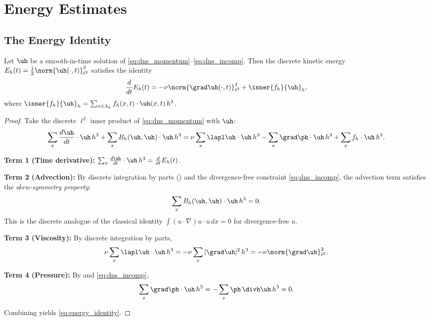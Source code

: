 \documentclass[12pt, a4paper]{article}
\theoremstyle{plain}
\theoremstyle{definition}
\begin{document}
\section{Energy Estimates}\label{sec:energy}

\subsection{The Energy Identity}

\begin{proposition}\label{prop:energy_id}
  Let $\uh$ be a smooth-in-time solution of \eqref{eq:dns_momentum}--\eqref{eq:dns_incomp}.
  Then the discrete kinetic energy $E_h(t) = \frac{1}{2}\norm{\uh(\cdot,t)}_{\ell^2}^2$
  satisfies the identity
  \begin{equation}\label{eq:energy_identity}
    \frac{d}{dt}E_h(t) = -\nu\norm{\grad\uh(\cdot,t)}_{\ell^2}^2 + \inner{f_h}{\uh}_h,
  \end{equation}
  where $\inner{f_h}{\uh}_h = \sum_{x \in \Lambda_h} f_h(x,t) \cdot \uh(x,t) \, h^3$.
\end{proposition}

\begin{proof}
  Take the discrete $\ell^2$ inner product of \eqref{eq:dns_momentum} with $\uh$:
  \begin{equation}
    \sum_{x} \frac{d\uh}{dt} \cdot \uh \, h^3
    + \sum_{x} B_h(\uh,\uh) \cdot \uh \, h^3
    = \nu \sum_{x} \lapl\uh \cdot \uh \, h^3
    - \sum_{x} \grad\ph \cdot \uh \, h^3
    + \sum_{x} f_h \cdot \uh \, h^3.
  \end{equation}

  \textbf{Term 1 (Time derivative):}
  $\sum_{x} \frac{d\uh}{dt} \cdot \uh \, h^3 = \frac{d}{dt}E_h(t)$.

  \textbf{Term 2 (Advection):} By discrete integration by parts
  () and the divergence-free constraint \eqref{eq:dns_incomp},
  the advection term satisfies the \emph{skew-symmetry property}:
  \begin{equation}\label{eq:skew}
    \sum_{x} B_h(\uh,\uh) \cdot \uh \, h^3 = 0.
  \end{equation}
  This is the discrete analogue of the classical identity
  $\int (u \cdot \nabla)u \cdot u \, dx = 0$ for divergence-free $u$.

  \textbf{Term 3 (Viscosity):} By discrete integration by parts,
  \begin{equation}
    \nu \sum_{x} \lapl\uh \cdot \uh \, h^3
    = -\nu \sum_{x} |\grad\uh|^2 \, h^3
    = -\nu \norm{\grad\uh}_{\ell^2}^2.
  \end{equation}

  \textbf{Term 4 (Pressure):} By  and \eqref{eq:dns_incomp},
  \begin{equation}
    \sum_{x} \grad\ph \cdot \uh \, h^3 = -\sum_{x} \ph \, \divh\uh \, h^3 = 0.
  \end{equation}

  Combining yields \eqref{eq:energy_identity}.
\end{proof}
\end{document}
